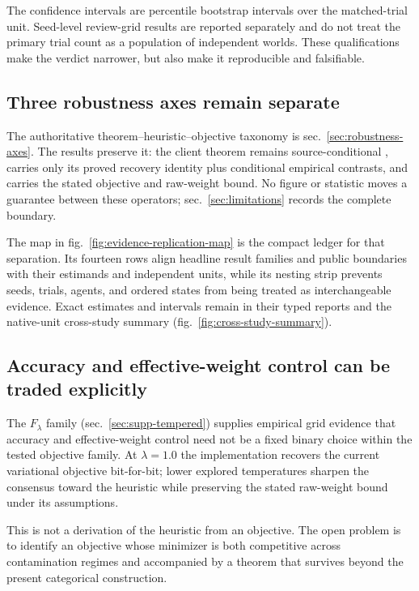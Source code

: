 \documentclass[
  english,
]{article}
\theoremstyle{plain}
\theoremstyle{definition}
\theoremstyle{remark}
\theoremstyle{definition}
\begin{document}
The confidence intervals are percentile bootstrap intervals over the
matched-trial unit. Seed-level review-grid results are reported
separately and do not treat the primary trial count as a population of
independent worlds. These qualifications make the verdict narrower, but
also make it reproducible and falsifiable.

\subsection{Three robustness axes remain
separate}\label{sec:discussion-axes}

The authoritative theorem--heuristic--objective taxonomy is
sec.~\ref{sec:robustness-axes}. The results preserve it: the client
theorem remains source-conditional \citep{mildner2025fedgvi},
 carries only its proved recovery identity
plus conditional empirical contrasts, and
 carries the stated objective and
raw-weight bound. No figure or statistic moves a guarantee between these
operators; sec.~\ref{sec:limitations} records the complete boundary.

The map in fig.~\ref{fig:evidence-replication-map} is the compact ledger
for that separation. Its fourteen rows align headline result families
and public boundaries with their estimands and independent units, while
its nesting strip prevents seeds, trials, agents, and ordered states
from being treated as interchangeable evidence. Exact estimates and
intervals remain in their typed reports and the native-unit cross-study
summary (fig.~\ref{fig:cross-study-summary}).

\subsection{Accuracy and effective-weight control can be traded
explicitly}\label{sec:discussion-tempered}

The \(F_\lambda\) family (sec.~\ref{sec:supp-tempered}) supplies
empirical grid evidence that accuracy and effective-weight control need
not be a fixed binary choice within the tested objective family. At
\(\lambda = 1.0\) the implementation recovers the current variational
objective bit-for-bit; lower explored temperatures sharpen the consensus
toward the heuristic while preserving the stated raw-weight bound under
its assumptions.

This is not a derivation of the heuristic from an objective. The open
problem is to identify an objective whose minimizer is both competitive
across contamination regimes and accompanied by a theorem that survives
beyond the present categorical construction.
\end{document}
